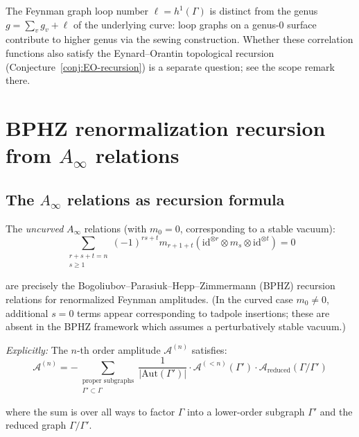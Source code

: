 \begin{remark}
The Feynman graph loop number $\ell = h^1(\Gamma)$ is distinct from the
genus~$g = \sum_v g_v + \ell$ of the underlying curve: loop graphs on a
genus-$0$ surface contribute to higher genus via the sewing construction.
Whether these correlation functions also satisfy the Eynard--Orantin
topological recursion (Conjecture~\ref{conj:EO-recursion}) is a separate
question; see the scope remark there.
\end{remark}


\section{\texorpdfstring{BPHZ renormalization recursion from $A_\infty$ relations}{BPHZ renormalization recursion from A infty relations}}
\label{sec:bphz-ainfinity}

\subsection{\texorpdfstring{The $A_\infty$ relations as recursion formula}{The A infty relations as recursion formula}}

\begin{conjecture}[BPHZ recursion = \texorpdfstring{$A_\infty$}{A-infinity} consistency; \ClaimStatusHeuristic]
\label{conj:bphz-recursion}
The \emph{uncurved} $A_\infty$ relations (with $m_0 = 0$, corresponding to a stable vacuum):
\[\sum_{\substack{r+s+t=n \\ s \geq 1}} (-1)^{rs+t} m_{r+1+t}(\mathrm{id}^{\otimes r} \otimes m_s \otimes
\mathrm{id}^{\otimes t}) = 0\]

are precisely the Bogoliubov--Parasiuk--Hepp--Zimmermann (BPHZ) recursion relations
for renormalized Feynman amplitudes.  (In the curved case $m_0 \neq 0$, additional $s = 0$ terms appear corresponding to tadpole insertions; these are absent in the BPHZ framework which assumes a perturbatively stable vacuum.)

\emph{Explicitly:} The $n$-th order amplitude $\mathcal{A}^{(n)}$ satisfies:
\[\mathcal{A}^{(n)} = -\sum_{\substack{\text{proper subgraphs} \\ \Gamma' \subset \Gamma}} 
\frac{1}{|\text{Aut}(\Gamma')|} \cdot \mathcal{A}^{(<n)}(\Gamma') \cdot 
\mathcal{A}_{\text{reduced}}(\Gamma/\Gamma')\]

where the sum is over all ways to factor $\Gamma$ into a lower-order subgraph $\Gamma'$ 
and the reduced graph $\Gamma/\Gamma'$.
\end{conjecture}

